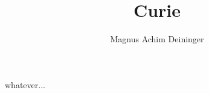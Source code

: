 \documentclass[a4paper,twoside,titlepage]{article}
\title{Curie}
\author{Magnus Achim Deininger}
\begin{document}
whatever...
\end{document}
